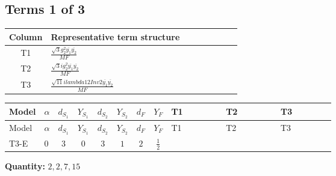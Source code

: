 \documentclass[8pt]{article}
\begin{document}
\begin{landscape}
\subsection*{Terms 1 of 3}
\begin{center}
\begin{tabular}{@{}c >{\raggedright\arraybackslash}p{0.82\linewidth}@{}}
\toprule
Column & Representative term structure \\
\midrule
T1 & \(\displaystyle \frac{\sqrt{3} g_{2}^{2} \overline{y_{1}} \overline{y_{2}}}{MF}\) \\
\midrule
T2 & \(\displaystyle \frac{\sqrt{3} i g_{2}^{2} \overline{y_{1}} \overline{y_{2}}}{MF}\) \\
\midrule
T3 & \(\displaystyle \frac{\sqrt{11} i lambda12Inv2 \overline{y_{1}} \overline{y_{2}}}{MF}\) \\
\midrule
\bottomrule
\end{tabular}
\end{center}
\smallskip
\tiny
\begin{longtable}{@{}llcccccc >{\raggedright\arraybackslash}p{0.21\linewidth} >{\raggedright\arraybackslash}p{0.21\linewidth} >{\raggedright\arraybackslash}p{0.21\linewidth}@{}}
\toprule
Model & $\alpha$ & $d_{S_1}$ & $Y_{S_1}$ & $d_{S_2}$ & $Y_{S_2}$ & $d_F$ & $Y_F$ & T1 & T2 & T3 \\
\midrule
\endfirsthead
\toprule
Model & $\alpha$ & $d_{S_1}$ & $Y_{S_1}$ & $d_{S_2}$ & $Y_{S_2}$ & $d_F$ & $Y_F$ & T1 & T2 & T3 \\
\midrule
\endhead
T3-E & $0$ & $3$ & $0$ & $3$ & $1$ & $2$ & $\frac{1}{2}$ & \scriptsize\adjustbox{max width=\linewidth}{$\begin{gathered} \frac{\sqrt{3} g_{2}^{2} \overline{y_{1}} \overline{y_{2}}}{6 MF}\end{gathered}$} & \scriptsize\adjustbox{max width=\linewidth}{$\begin{gathered} - \frac{49 \sqrt{3} i g_{2}^{2} \overline{y_{1}} \overline{y_{2}}}{24 MF}\end{gathered}$} & \scriptsize\adjustbox{max width=\linewidth}{$\begin{gathered} - \frac{3 \sqrt{11} i lambda12Inv2 \overline{y_{1}} \overline{y_{2}}}{22 MF}\end{gathered}$} \\
\midrule
\bottomrule
\end{longtable}
\clearpage
\noindent\textbf{Quantity: }$\mathrm{2,2,7,15}$\par\smallskip

\end{landscape}
\end{document}
